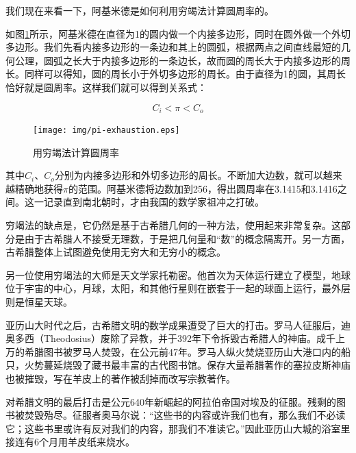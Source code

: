 \documentclass{article}
\begin{document}

我们现在来看一下，阿基米德是如何利用穷竭法计算圆周率的。

如图\ref{fig:pi-exhaustion}所示，阿基米德在直径为1的圆内做一个内接多边形，同时在圆外做一个外切多边形。我们先看内接多边形的一条边和其上的圆弧，根据两点之间直线最短的几何公理，圆弧之长大于内接多边形的一条边长，故而圆的周长大于内接多边形的周长。同样可以得知，圆的周长小于外切多边形的周长。由于直径为1的圆，其周长恰好就是圆周率。这样我们就可以得到关系式：

\[
  C_i < \pi < C_o
\]

\begin{figure}[htbp]
 \centering
 \texttt{[image: img/pi-exhaustion.eps]}
 \caption{用穷竭法计算圆周率}
 \label{fig:pi-exhaustion}
\end{figure}

其中$C_i$、$C_o$分别为内接多边形和外切多边形的周长。不断加大边数，就可以越来越精确地获得$\pi$的范围。阿基米德将边数加到256，得出圆周率在3.1415和3.1416之间。这一记录直到南北朝时，才由我国的数学家祖冲之打破。

穷竭法的缺点是，它仍然是基于古希腊几何的一种方法，使用起来非常复杂。这部分是由于古希腊人不接受无理数，于是把几何量和“数”的概念隔离开。另一方面，古希腊整体上试图避免使用无穷大和无穷小的概念。

另一位使用穷竭法的大师是天文学家托勒密。他首次为天体运行建立了模型，地球位于宇宙的中心，月球，太阳，和其他行星则在嵌套于一起的球面上运行，最外层则是恒星天球。

亚历山大时代之后，古希腊文明的数学成果遭受了巨大的打击。罗马人征服后，迪奥多西（Theodosius）废除了异教，并于392年下令拆毁古希腊人的神庙。成千上万的希腊图书被罗马人焚毁，在公元前47年。罗马人纵火焚烧亚历山大港口内的船只，火势蔓延烧毁了藏书最丰富的古代图书馆。保存大量希腊著作的塞拉皮斯神庙也被摧毁，写在羊皮上的著作被刮掉而改写宗教著作。

对希腊文明的最后打击是公元640年新崛起的阿拉伯帝国对埃及的征服。残剩的图书被焚毁殆尽。征服者奥马尔说：“这些书的内容或许我们也有，那么我们不必读它；这些书里或许有反对我们的内容，那我们不准读它。”因此亚历山大城的浴室里接连有6个月用羊皮纸来烧水\cite{M-Kline-2007}。
\end{document}
